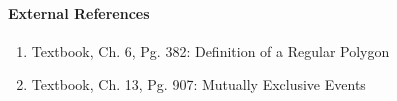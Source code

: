 \documentclass[letterpaper,12pt,twoside]{report}
\begin{document}
	\paragraph{External References}
	
	\begin{enumerate}
		\item Textbook, Ch. 6, Pg. 382: Definition of a Regular Polygon
		\item Textbook, Ch. 13, Pg. 907: Mutually Exclusive Events
	\end{enumerate}
	
\end{document}
